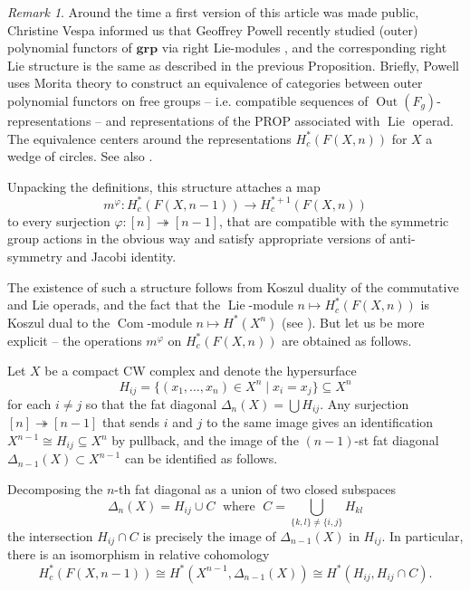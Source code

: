 \documentclass[12pt]{article}
\DeclareMathOperator{\Lie}{Lie}
\DeclareMathOperator{\Out}{Out}
\theoremstyle{plain}
\theoremstyle{definition}
\theoremstyle{remark}
\newtheorem{rmk}[thm]{Remark}
\begin{document}
\begin{rmk}
Around the time a first version of this article was made public, Christine Vespa informed us that Geoffrey Powell recently studied (outer) polynomial functors of $\bm{grp}$ via right Lie-modules 
\cite{Pow21, Pow22, PowBabyBead}, and the corresponding right Lie structure is the same as described in the previous Proposition. Briefly, Powell uses Morita theory to construct an equivalence of categories between outer polynomial functors on free groups -- i.e. compatible sequences of $\Out(F_g)$-representations -- and representations of the PROP associated with $\Lie$ operad. The equivalence centers around the representations $H^*_c(F(X,n))$ for $X$ a wedge of circles.
See also \cite[\S 2.4-2.5]{Ves22}. %
\end{rmk}

Unpacking the definitions, this structure attaches a map
    \[
    m^\varphi: H^*_c(F(X,n-1)) \to H^{*+1}_c(F(X,n))
    \]
to every surjection $\varphi:[n]\twoheadrightarrow [n-1]$, that are compatible with the symmetric group actions in the obvious way and satisfy appropriate versions of anti-symmetry and Jacobi identity.

The existence of such a structure follows from Koszul duality of the commutative and Lie operads, and the fact that the $\Lie$-module $n\mapsto H^*_c(F(X,n))$ is Koszul dual to the $\operatorname{Com}$-module $n\mapsto H^*(X^n)$ (see \cite[Lemma 11.4]{arone-turchin}). But let us be more explicit -- the operations $m^\varphi$ on $H^*_c(F(X,n))$ are obtained as follows.

Let $X$ be a compact CW complex and denote the hypersurface 
\[
H_{ij} = \{ (x_1,\ldots,x_n)\in X^n \mid x_i=x_j \} \subseteq X^n
\]
for each $i\neq j$ so that the fat diagonal $\Delta_n(X) = \bigcup H_{ij}$. Any surjection $[n]\twoheadrightarrow [n-1]$ that sends $i$ and $j$ to the same image gives an identification $X^{n-1} \cong H_{ij} \subseteq X^n$ by pullback, and the image of the $(n-1)$-st fat diagonal $\Delta_{n-1}(X)\subset X^{n-1}$ can be identified as follows.

Decomposing the $n$-th fat diagonal as a union of two closed subspaces
\begin{equation}
    \Delta_n(X) = H_{ij} \cup C \;\text{ where }\; C = \bigcup_{\{k,l\}\neq \{i,j\}} H_{kl}
\end{equation}
the intersection $H_{ij}\cap C$ is precisely the image of $\Delta_{n-1}(X)$ in $H_{ij}$. In particular, there is an isomorphism in relative cohomology
\begin{equation}
    H^*_c(F(X,n-1)) \cong H^*(X^{n-1},\Delta_{n-1}(X)) \cong H^*(H_{ij},H_{ij}\cap C).
\end{equation}
\end{document}
